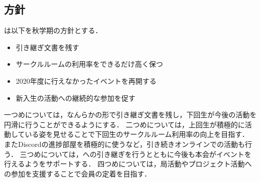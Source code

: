 \subsection*{\newGradeIfKouki{}\thirdGrade{}方針}


\thirdGrade{}は以下を秋学期の方針とする．

\begin{itemize}
    \item 引き継ぎ文書を残す
    \item サークルルームの利用率をできるだけ高く保つ
    \item 2020年度に行えなかったイベントを再開する
    \item 新入生の活動への継続的な参加を促す
\end{itemize}

一つめについては，なんらかの形で引き継ぎ文書を残し，下回生が今後の活動を円滑に行うことができるようにする．
二つめについては，上回生が積極的に活動している姿を見せることで下回生のサークルルーム利用率の向上を目指す．
またDiscordの進捗部屋を積極的に使うなど，引き続きオンラインでの活動も行う．
三つめについては，\secondGrade{}への引き継ぎを行うとともに今後も本会がイベントを行えるよう\secondGrade{}をサポートする．
四つめについては，局活動やプロジェクト活動への参加を支援することで会員の定着を目指す．
